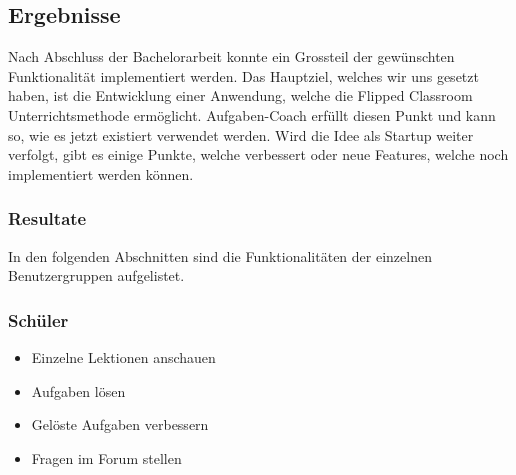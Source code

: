 \newpage
\subsection{Ergebnisse}
Nach Abschluss der Bachelorarbeit konnte ein Grossteil der gewünschten Funktionalität implementiert werden. Das Hauptziel, welches wir uns gesetzt haben, ist die Entwicklung einer Anwendung, welche die Flipped Classroom Unterrichtsmethode ermöglicht. Aufgaben-Coach erfüllt diesen Punkt und kann so, wie es jetzt existiert verwendet werden. Wird die Idee als Startup weiter verfolgt, gibt es einige Punkte, welche verbessert oder neue Features, welche noch implementiert werden können.

\subsubsection{Resultate}
In den folgenden Abschnitten sind die Funktionalitäten der einzelnen Benutzergruppen aufgelistet.
\subsubsection*{Schüler}
\begin{itemize}
	\item Einzelne Lektionen anschauen
	\item Aufgaben lösen
	\item Gelöste Aufgaben verbessern
	\item Fragen im Forum stellen
\end{itemize}

